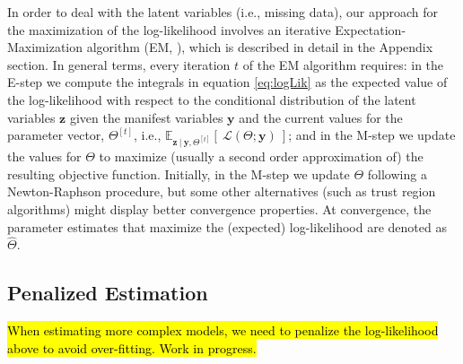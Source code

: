 \documentclass[11pt, a4paper]{article}
\newcommand{\cond}{\!~|~\!}
\begin{document}
In order to deal with the latent variables (i.e., missing data), our approach for the maximization of the log-likelihood involves an iterative Expectation-Maximization algorithm (EM, \citealp{DempsterEtAl_JRSS1977, Bock&Aitkin_Psychometrika1981}), which is described in detail in the Appendix section. In general terms, every iteration $t$ of the EM algorithm requires: in the E-step we compute the integrals in equation \eqref{eq:logLik} as the expected value of the log-likelihood with respect to the conditional distribution of the latent variables $\mathbf{z}$ given the manifest variables $\mathbf{y}$ and the current values for the parameter vector, $\Theta^{[t]}$, i.e., $\mathbb{E}_{\mathbf{z} \cond \mathbf{y},\Theta^{[t]}} [\!~ \mathcal{L}(\Theta; \mathbf{y}) \!~]$; and in the M-step we update the values for $\Theta$ to maximize (usually a second order approximation of) the resulting objective function. Initially, in the M-step we update $\Theta$ following a Newton-Raphson procedure, but some other alternatives (such as trust region algorithms) might display better convergence properties. At convergence, the parameter estimates that maximize the (expected) log-likelihood are denoted as $\hat{\Theta}$.

\subsection{Penalized Estimation}

\hl{When estimating more complex models, we need to penalize the log-likelihood above to avoid over-fitting. Work in progress.}


\end{document}

